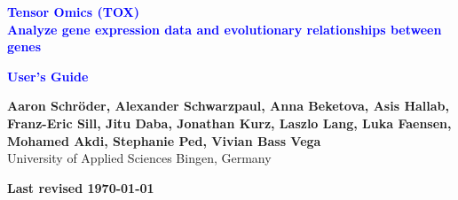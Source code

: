 \vspace*{3cm}
\noindent
{\Huge \textcolor{blue}{\textbf{Tensor Omics (TOX)}}}\\[0.5cm]
\noindent
{\Huge \textcolor{blue}{\textbf{Analyze gene expression data and evolutionary relationships between genes}}}\\[0.5cm]
\vspace*{1cm}

\noindent
{\Huge \textcolor{blue}{\textbf{User’s Guide}}}

\vspace{2cm}

\noindent
\textbf{\large
Aaron Schröder,
Alexander Schwarzpaul,
Anna Beketova,
Asis Hallab,
Franz-Eric Sill,
Jitu Daba,
Jonathan Kurz,
Laszlo Lang,
Luka Faensen,
Mohamed Akdi,
Stephanie Ped,
Vivian Bass Vega
}\\[0.2cm]

{\small University of Applied Sciences Bingen, Germany }

\vspace{2cm}

\noindent
\textbf{Last revised \today}